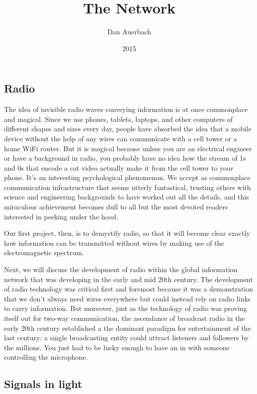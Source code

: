 \documentclass[UTF8]{book}
\begin{document}
\begin{CJK}{UTF8}{gbsn}

\title{The Network}
\author{Dan Auerbach}
\date{2015}
\maketitle

\part{Radio}

The idea of invisible radio waves conveying information is at once commonplace and magical. Since we use phones, tablets, laptops, and other computers of different shapes and sizes every day, people have absorbed the idea that a mobile device without the help of any wires can communicate with a cell tower or a home WiFi router. But it is magical because unless you are an electrical engineer or have a background in radio, you probably have no idea how the stream of 1s and 0s that encode a cat video actually make it from the cell tower to your phone. It's an interesting psychological phenomenon. We accept as commonplace communication infrastructure that seems utterly fantastical, trusting others with science and engineering backgrounds to have worked out all the details, and this miraculous achievement becomes dull to all but the most devoted readers interested in peeking under the hood.

Our first project, then, is to demystify radio, so that it will become clear exactly how information can be transmitted without wires by making use of the electromagnetic spectrum.

Next, we will discuss the development of radio within the global information network that was developing in the early and mid 20th century. The development of radio technology was critical first and foremost because it was a demonstration that we don't always need wires everywhere but could instead rely on radio links to carry information. But moreover, just as the technology of radio was proving itself out for two-way communication, the ascendance of broadcast radio in the early 20th century established a the dominant paradigm for entertainment of the last century: a single broadcasting entity could attract listeners and followers by the millions. You just had to be lucky enough to have an in with someone controlling the microphone.

\chapter{Signals in light}


\end{CJK}
\end{document}
